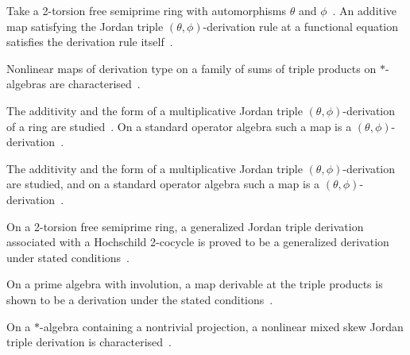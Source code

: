 Take a 2-torsion free semiprime ring with automorphisms $\theta$ and $\phi$~\cite{WlOnCertainFunctional2011}.
An
additive map satisfying the Jordan triple $(\theta,\phi)$-derivation rule at a
functional equation satisfies the derivation rule
itself~\cite{WlOnCertainFunctional2011}.

Nonlinear maps of derivation type on a family of sums of triple products on
$*$-algebras are characterised~\cite{WlNonlinearMapsOf2023}.

The additivity and the form of a multiplicative Jordan triple
$(\theta,\phi)$-derivation of a ring are studied~\cite{WlMultiplicativeJordanTriple2020}. On a standard operator
algebra such a map is a
$(\theta,\phi)$-derivation~\cite{WlMultiplicativeJordanTriple2020}.

The additivity and the form of a multiplicative Jordan triple
$(\theta,\phi)$-derivation are studied, and on a standard operator algebra
such a map is a
$(\theta,\phi)$-derivation~\cite{WlMultiplicativeJordanTripleThet2025}.

On a 2-torsion free semiprime ring, a generalized Jordan triple derivation
associated with a Hochschild 2-cocycle is proved to be a generalized
derivation under stated
conditions~\cite{WlGeneralizedJordanTripleDerivat2024}.

On a prime algebra with involution, a map derivable at the triple products is
shown to be a derivation under the stated
conditions~\cite{WlTripleDerivableMapsOnPrimeAlge2020}.

On a $*$-algebra containing a nontrivial projection, a nonlinear mixed skew
Jordan triple derivation is
characterised~\cite{WlCharacterizationOfNonlinearMix2020}.

